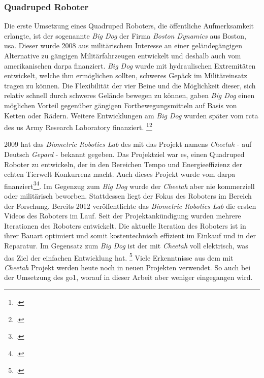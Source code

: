 \subsubsection{Quadruped Roboter}
\label{subsubsec:quadruped-roboter}
Die erste Umsetzung eines Quadruped Roboters, die öffentliche Aufmerksamkeit erlangte, ist der sogenannte \emph{Big Dog}
der Firma \emph{Boston Dynamics} aus Boston, \gls{usa}.
Dieser wurde \num{2008} aus militärischem Interesse an einer geländegängigen Alternative zu gängigen Militärfahrzeugen entwickelt und
deshalb auch vom amerikanischen \gls{darpa} finanziert. \emph{Big Dog} wurde mit hydraulischen Extremitäten entwickelt, welche ihm ermöglichen sollten,
schweres Gepäck im Militäreinsatz tragen zu können.
Die Flexibilität der vier Beine und die Möglichkeit dieser, sich relativ schnell durch schweres Gelände bewegen zu können,
gaben \emph{Big Dog} einen möglichen Vorteil gegenüber gängigen Fortbewegungsmitteln auf Basis von Ketten oder Rädern.
Weitere Entwicklungen am \emph{Big Dog} wurden später vom \gls{rcta} des \gls{us} Army Research Laboratory finanziert.
\footcite{bigdog}\footcite{darpa_bigdog}

\num{2009} hat das \emph{Biometric Robotics Lab} des \gls{mit} das Projekt namens \emph{Cheetah} - auf Deutsch \emph{Gepard} -
bekannt gegeben.
Das Projektziel war es, einen Quadruped Roboter zu entwickeln, der in den Bereichen Tempo und Energieeffizienz der echten
Tierwelt Konkurrenz macht.
Auch dieses Projekt wurde vom \gls{darpa} finanziert\footcite{bi_mit_cheetah_funding}\footcite{darpa_m3}.
Im Gegenzug zum \emph{Big Dog} wurde der \emph{Cheetah} aber nie kommerziell oder militärisch beworben.
Stattdessen liegt der Fokus des Roboters im Bereich der Forschung.
Bereits \num{2012} veröffentlichte das \emph{Biometric Robotics Lab} die ersten Videos des Roboters im Lauf.
Seit der Projektankündigung wurden mehrere Iterationen des Roboters entwickelt.
Die aktuelle Iteration des Roboters ist in ihrer Bauart optimiert und somit kostentechnisch effizient im Einkauf und in der Reparatur.
Im Gegensatz zum \emph{Big Dog} ist der \gls{mit} \emph{Cheetah} voll elektrisch, was das Ziel der einfachen Entwicklung hat.
\footcite{ieee_spectrum_cheetah}
Viele Erkenntnisse aus dem \gls{mit} \emph{Cheetah} Projekt werden heute noch in neuen Projekten verwendet.
So auch bei der Umsetzung des \gls{go1}, worauf in dieser Arbeit aber weniger eingegangen wird.


